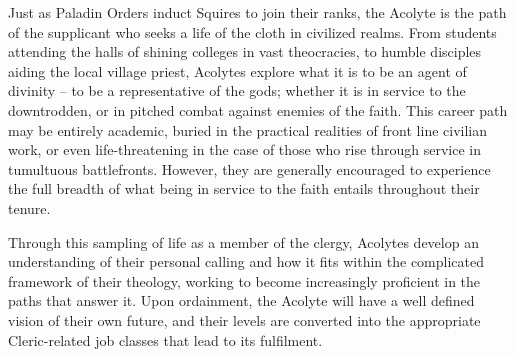  

Just as Paladin Orders induct Squires to join their ranks, the Acolyte is the path of the supplicant who seeks a life of the cloth in civilized realms. From students attending the halls of shining colleges in vast theocracies, to humble disciples aiding the local village priest, Acolytes explore what it is to be an agent of divinity – to be a representative of the gods; whether it is in service to the downtrodden, or in pitched combat against enemies of the faith. This career path may be entirely academic, buried in the practical realities of front line civilian work, or even life-threatening in the case of those who rise through service in tumultuous battlefronts. However, they are generally encouraged to experience the full breadth of what being in service to the faith entails throughout their tenure.

 

Through this sampling of life as a member of the clergy, Acolytes develop an understanding of their personal calling and how it fits within the complicated framework of their theology, working to become increasingly proficient in the paths that answer it. Upon ordainment, the Acolyte will have a well defined vision of their own future, and their levels are converted into the appropriate Cleric-related job classes that lead to its fulfilment.